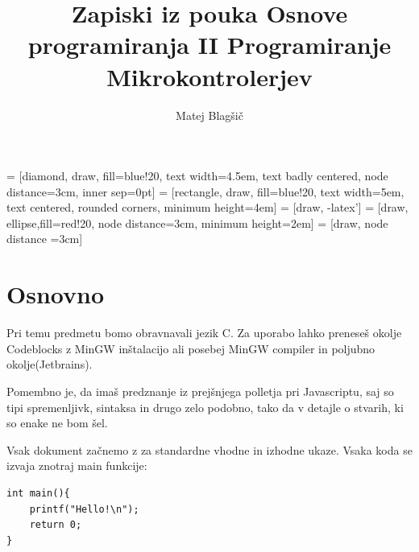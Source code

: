\documentclass[a4paper, 12pt]{article}
\title{Zapiski iz pouka Osnove programiranja II Programiranje Mikrokontrolerjev}
\author{Matej Blagšič}
\begin{document}
 = [diamond, draw, fill=blue!20, 
text width=4.5em, text badly centered, node distance=3cm, inner sep=0pt]
 = [rectangle, draw, fill=blue!20, 
text width=5em, text centered, rounded corners, minimum height=4em]
 = [draw, -latex']
 = [draw, ellipse,fill=red!20, node distance=3cm,
minimum height=2em]
 = [draw, node distance =3cm]

\newcommand{\harpoon}{\overset{\rightharpoonup}}


\maketitle
\thispagestyle{empty}
\pagebreak
\setcounter{page}{1}

\tableofcontents
\pagebreak



\section{Osnovno}

Pri temu predmetu bomo obravnavali jezik C. Za uporabo lahko preneseš okolje Codeblocks z MinGW inštalacijo ali posebej MinGW compiler in poljubno okolje(Jetbrains).\

Pomembno je, da imaš predznanje iz prejšnjega polletja pri Javascriptu, saj so tipi spremenljivk, sintaksa in drugo zelo podobno, tako da v detajle o stvarih, ki so enake ne bom šel.\



Vsak dokument začnemo z  za standardne vhodne in izhodne ukaze.
Vsaka koda se izvaja znotraj main funkcije:


\begin{lstlisting}
int main(){
    printf("Hello!\n");
    return 0;
}
\end{lstlisting}
\end{document}
